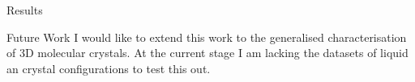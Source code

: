 \documentclass[]{beamer}
\begin{document}
\begin{frame}[t]{}
\begin{columns}[t]
\begin{column}{0.45\linewidth}
\begin{block}{Results}
      \end{block}

      \begin{block}{Future Work}
        I would like to extend this work to the
        generalised characterisation of 3D molecular crystals.
        At the current stage I am lacking the datasets of
        liquid an crystal configurations to test this out.
      \end{block}

    \end{column}
  \end{columns}
\end{frame}
\end{document}

